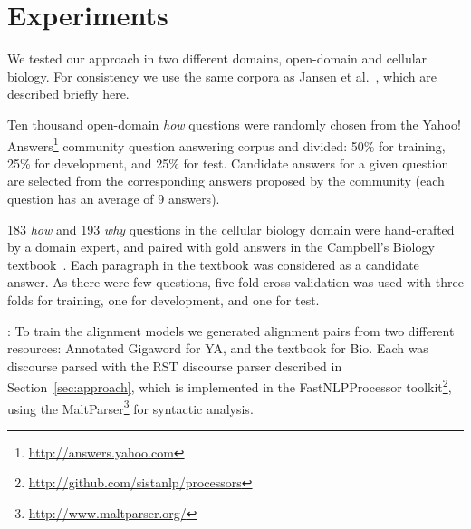 \section{Experiments}
\label{sec:experiments}



We tested our approach in two different domains, open-domain and cellular biology. For consistency we use the same corpora as Jansen et al.~\citeyear{jansen14}, which are described briefly here. 

{}  Ten thousand open-domain \emph{how} questions were randomly chosen from the Yahoo! Answers\footnote{\url{http://answers.yahoo.com}} community question answering corpus and divided: 50\% for training, 25\% for development, and 25\% for test.  Candidate answers for a given question are selected from the corresponding answers proposed by the community (each question has an average of 9 answers).

{} 183 \emph{how} and 193 \emph{why}  questions in the cellular biology domain were hand-crafted by a domain expert, and paired with gold answers in the Campbell's Biology textbook~\cite{Reece:2011}.  Each paragraph in the textbook was considered as a candidate answer.  As there were few questions, five fold cross-validation was used with three folds for training, one for development, and one for test.


{}: To train the alignment models we generated alignment pairs from two different resources: Annotated Gigaword \cite{Napoles2012} for YA, and the textbook for Bio.  Each was discourse parsed with the RST discourse parser described in Section~\ref{sec:approach}, which is implemented in the FastNLPProcessor toolkit\footnote{\url{http://github.com/sistanlp/processors}}, using the MaltParser\footnote{\url{http://www.maltparser.org/}} for syntactic analysis.


